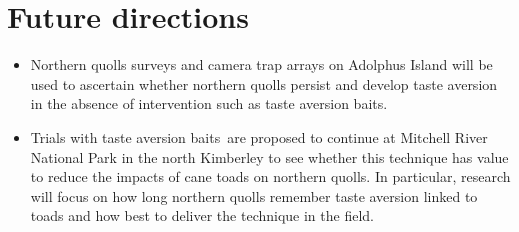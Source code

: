 \documentclass[version=last,
    paper=a4, %
    10pt, %
    usenames,
    dvipsnames,
    oneside, %
    headings=openany, %
    DIV=15 %
]{scrbook}
\begin{document}
\section*{Future directions}
\begin{itemize}
\itemsep1pt\parskip0pt
\item
  Northern quolls surveys and camera trap arrays on Adolphus Island will
  be used to ascertain whether northern quolls persist and develop taste
  aversion in the absence of intervention such as taste aversion baits.
\item
  Trials with taste aversion baits~are proposed to continue at Mitchell
  River National Park in the north Kimberley to see whether this
  technique has value to reduce the impacts of cane toads on northern
  quolls. In particular, research will focus on how long northern quolls
  remember taste aversion linked to toads and how best to deliver the
  technique in the field.
\end{itemize}



\end{document}
